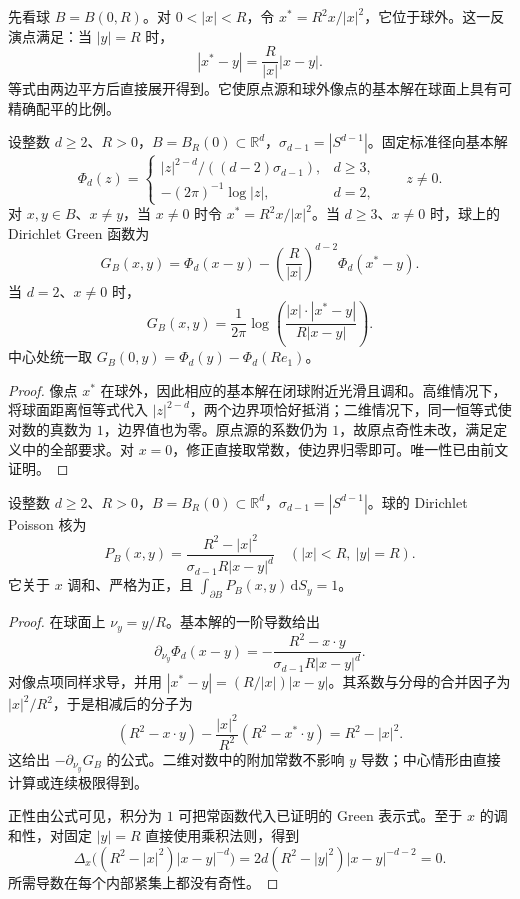 先看球 \(B=B(0,R)\)。对 \(0<|x|<R\)，令 \(x^*=R^2x/|x|^2\)，它位于球外。这一反演点满足：当 \(|y|=R\) 时，
\[
 |x^*-y|=\dfrac R{|x|}|x-y|.
\]
等式由两边平方后直接展开得到。它使原点源和球外像点的基本解在球面上具有可精确配平的比例。

\begin{proposition}\label{b2:prop:13-ball-green}
设整数 \(d\geq2\)、\(R>0\)，\(B=B_R(0)\subset\mathbb R^d\)，\(\sigma_{d-1}=|S^{d-1}|\)。固定标准径向基本解
\[
 \Phi_d(z)=
 \begin{cases}
 |z|^{2-d}/((d-2)\sigma_{d-1}),&d\geq3,\\
 -(2\pi)^{-1}\log|z|,&d=2,
 \end{cases}
 \qquad z\ne0.
\]
对 \(x,y\in B\)、\(x\ne y\)，当 \(x\ne0\) 时令 \(x^*=R^2x/|x|^2\)。当 \(d\geq3\)、\(x\ne0\) 时，球上的 Dirichlet Green 函数为
\[
 G_B(x,y)=\Phi_d(x-y)
 -\left(\dfrac R{|x|}\right)^{d-2}\Phi_d(x^*-y).
\]
当 \(d=2\)、\(x\ne0\) 时，
\[
 G_B(x,y)=\dfrac1{2\pi}
 \log\left(\dfrac{|x|\cdot|x^*-y|}{R|x-y|}\right).
\]
中心处统一取 \(G_B(0,y)=\Phi_d(y)-\Phi_d(Re_1)\)。
\end{proposition}
\begin{proof}
像点 \(x^*\) 在球外，因此相应的基本解在闭球附近光滑且调和。高维情况下，将球面距离恒等式代入 \(|z|^{2-d}\)，两个边界项恰好抵消；二维情况下，同一恒等式使对数的真数为 \(1\)，边界值也为零。原点源的系数仍为 \(1\)，故原点奇性未改，满足定义中的全部要求。对 \(x=0\)，修正直接取常数，使边界归零即可。唯一性已由前文证明。
\end{proof}

\begin{proposition}\label{b2:prop:13-ball-poisson}
设整数 \(d\geq2\)、\(R>0\)，\(B=B_R(0)\subset\mathbb R^d\)，\(\sigma_{d-1}=|S^{d-1}|\)。球的 Dirichlet Poisson 核为
\begin{equation}\label{b2:eq:13-ball-poisson}
 P_B(x,y)=\dfrac{R^2-|x|^2}{\sigma_{d-1}R|x-y|^d}
 \quad(|x|<R,\ |y|=R).
\end{equation}
它关于 \(x\) 调和、严格为正，且 \(\int_{\partial B}P_B(x,y)\,\mathrm{d}S_y=1\)。
\end{proposition}
\begin{proof}
在球面上 \(\nu_y=y/R\)。基本解的一阶导数给出
\[
 \partial_{\nu_y}\Phi_d(x-y)
 =-\dfrac{R^2-x\cdot y}{\sigma_{d-1}R|x-y|^d}.
\]
对像点项同样求导，并用 \(|x^*-y|=(R/|x|)|x-y|\)。其系数与分母的合并因子为 \(|x|^2/R^2\)，于是相减后的分子为
\[
 (R^2-x\cdot y)-\dfrac{|x|^2}{R^2}(R^2-x^*\cdot y)=R^2-|x|^2.
\]
这给出 \(-\partial_{\nu_y}G_B\) 的公式。二维对数中的附加常数不影响 \(y\) 导数；中心情形由直接计算或连续极限得到。

正性由公式可见，积分为 \(1\) 可把常函数代入已证明的 Green 表示式。至于 \(x\) 的调和性，对固定 \(|y|=R\) 直接使用乘积法则，得到
\[
 \Delta_x\bigl((R^2-|x|^2)|x-y|^{-d}\bigr)
 =2d(R^2-|y|^2)|x-y|^{-d-2}=0.
\]
所需导数在每个内部紧集上都没有奇性。
\end{proof}


